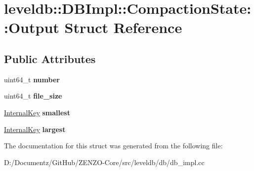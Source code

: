 \hypertarget{structleveldb_1_1_d_b_impl_1_1_compaction_state_1_1_output}{}\section{leveldb\+::D\+B\+Impl\+::Compaction\+State\+::Output Struct Reference}
\label{structleveldb_1_1_d_b_impl_1_1_compaction_state_1_1_output}
\subsection*{Public Attributes}
\begin{DoxyCompactItemize}
\item 
\mbox{\label{structleveldb_1_1_d_b_impl_1_1_compaction_state_1_1_output_aa4b759dca2a83bdb8d9edbf7e2d213e2}} 
uint64\+\_\+t {\bfseries number}
\item 
\mbox{\label{structleveldb_1_1_d_b_impl_1_1_compaction_state_1_1_output_a37906cee65a9d1873b7b7a4169f22402}} 
uint64\+\_\+t {\bfseries file\+\_\+size}
\item 
\mbox{\label{structleveldb_1_1_d_b_impl_1_1_compaction_state_1_1_output_a88ada857d0cf32ae8e76d7baf4e80c69}} 
\mbox{\hyperlink{classleveldb_1_1_internal_key}{Internal\+Key}} {\bfseries smallest}
\item 
\mbox{\label{structleveldb_1_1_d_b_impl_1_1_compaction_state_1_1_output_a6e257f231aba82d20cb7199a552b2a63}} 
\mbox{\hyperlink{classleveldb_1_1_internal_key}{Internal\+Key}} {\bfseries largest}
\end{DoxyCompactItemize}


The documentation for this struct was generated from the following file\+:\begin{DoxyCompactItemize}
\item 
D\+:/\+Documentz/\+Git\+Hub/\+Z\+E\+N\+Z\+O-\/\+Core/src/leveldb/db/db\+\_\+impl.\+cc\end{DoxyCompactItemize}
